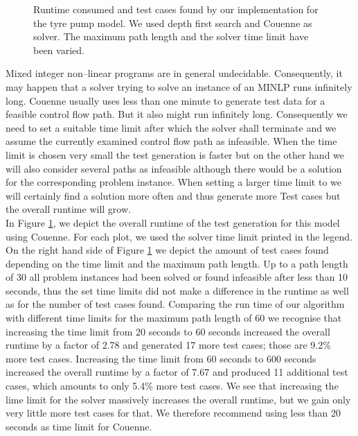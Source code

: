 \documentclass[runningheads,a4paper]{llncs}%
\begin{document}
\begin{figure}
\caption{Runtime consumed and test cases found by our implementation for the tyre pump model. We used depth first search and Couenne as solver. The maximum path length and the solver time limit have been varied.}
\label{fig:ExplodingTyresRuntime}
\end{figure}
Mixed integer non--linear programs are in general undecidable. Consequently, it may happen that a solver trying to solve an instance of an MINLP runs infinitely long. Couenne usually uses less than one minute to generate test data for a feasible control flow path. But it also might run infinitely long.
Consequently we need to set a suitable time limit after which the solver shall terminate and we assume the currently examined control flow path as infeasible. When the time limit is chosen very small the test generation is faster but on the other hand we will also consider several paths as infeasible although there would be a solution for the corresponding problem instance. When setting a larger time limit to we will certainly find a solution more often and thus generate more Test cases but the overall runtime will grow.\\
In Figure \ref{fig:ExplodingTyresRuntime}, we depict the overall runtime of the test generation for this model using Couenne. For each plot, we used the solver time limit printed in the legend. On the right hand side of Figure \ref{fig:ExplodingTyresRuntime} we depict the amount of test cases found depending on the time limit and the maximum path length. Up to a path length of 30 all problem instances had been solved or found infeasible after less than 10 seconds, thus the set time limits did not make a difference in the runtime as well as for the number of test cases found. Comparing the run time of our algorithm with different time limits for the maximum path length of 60 we recognise that increasing the time limit from 20 seconds to 60 seconds increased the overall runtime by a factor of 2.78 and generated 17 more test cases; those are 9.2\% more test cases. Increasing the time limit from 60 seconds to 600 seconds increased the overall runtime by a factor of 7.67 and produced 11 additional test cases, which amounts to only 5.4\% more test cases. We see that increasing the lime limit for the solver massively increases the overall runtime, but we gain only very little more test cases for that. We therefore recommend using less than 20 seconds as time limit for Couenne.
\end{document}
